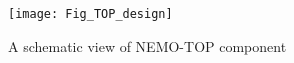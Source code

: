 \begin{figure}[ht]
\begin{center}
\vspace{0cm}
\texttt{[image: Fig\_TOP\_design]}
\caption{A schematic view of NEMO-TOP component}
\label{topdesign}
\end{center}
\end{figure}

